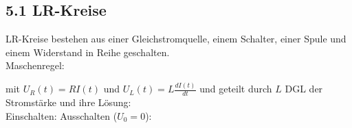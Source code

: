 \subsection*{5.1 LR-Kreise}
    LR-Kreise bestehen aus einer Gleichstromquelle, einem Schalter, einer Spule und einem Widerstand in Reihe geschalten.\\
    Maschenregel:

    mit $U_R(t) = R I(t)$ und $U_L(t) = L \frac{dI(t)}{dt}$ und geteilt durch $L$
    DGL der Stromstärke und ihre Lösung:\\
    Einschalten:
    Ausschalten ($U_0 = 0$):
